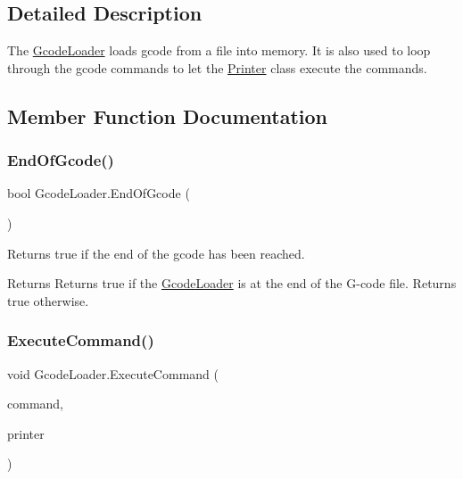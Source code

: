 \subsection{Detailed Description}
The \hyperlink{class_gcode_loader}{Gcode\+Loader} loads gcode from a file into memory. It is also used to loop through the gcode commands to let the \hyperlink{class_printer}{Printer} class execute the commands. 



\subsection{Member Function Documentation}
\mbox{\label{class_gcode_loader_a6b8aedf9e1c0b90d931626697bc9c3de}} 
\subsubsection{\texorpdfstring{End\+Of\+Gcode()}{EndOfGcode()}}
{\footnotesize\ttfamily bool Gcode\+Loader.\+End\+Of\+Gcode (\begin{DoxyParamCaption}{ }\end{DoxyParamCaption})}



Returns true if the end of the gcode has been reached. 

\begin{DoxyReturn}{Returns}
Returns true if the \hyperlink{class_gcode_loader}{Gcode\+Loader} is at the end of the G-\/code file. Returns true otherwise.
\end{DoxyReturn}
\mbox{\label{class_gcode_loader_a82cfb2c8e208446db42b8d570bf9bc85}} 
\subsubsection{\texorpdfstring{Execute\+Command()}{ExecuteCommand()}}
{\footnotesize\ttfamily void Gcode\+Loader.\+Execute\+Command (\begin{DoxyParamCaption}\item[{\hyperlink{class_gcode_command}{Gcode\+Command}}]{command,  }\item[{\hyperlink{class_printer}{Printer}}]{printer }\end{DoxyParamCaption})\hspace{0.3cm}{\ttfamily [private]}}



